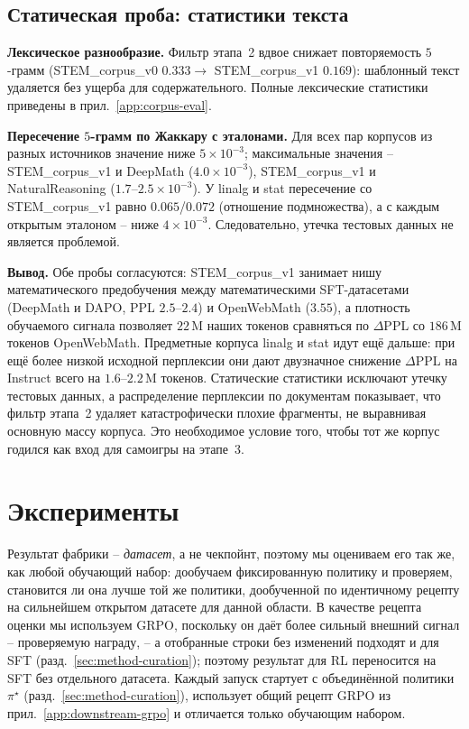 \documentclass{article}
\begin{document}
\subsection{Статическая проба: статистики текста}\label{sec:corpus-eval-static}

\textbf{Лексическое разнообразие.}
Фильтр этапа~2 вдвое снижает повторяемость $5$-грамм (STEM\_corpus\_v0 $0.333 \to$ STEM\_corpus\_v1 $0.169$): шаблонный текст удаляется без ущерба для содержательного. Полные лексические статистики приведены в прил.~\ref{app:corpus-eval}.

\textbf{Пересечение $5$-грамм по Жаккару с эталонами.}
Для всех пар корпусов из разных источников значение ниже $5\!\times\!10^{-3}$; максимальные значения -- STEM\_corpus\_v1 и DeepMath ($4.0\!\times\!10^{-3}$), STEM\_corpus\_v1 и NaturalReasoning ($1.7$--$2.5\!\times\!10^{-3}$). У linalg и stat пересечение со STEM\_corpus\_v1 равно $0.065$/$0.072$ (отношение подмножества), а с каждым открытым эталоном -- ниже $4\!\times\!10^{-3}$. Следовательно, утечка тестовых данных не является проблемой.

\textbf{Вывод.}
Обе пробы согласуются: STEM\_corpus\_v1 занимает нишу математического предобучения между математическими SFT-датасетами (DeepMath и DAPO, PPL $2.5$--$2.4$) и OpenWebMath ($3.55$), а плотность обучаемого сигнала позволяет $22$\,M наших токенов сравняться по $\Delta$PPL со $186$\,M токенов OpenWebMath. Предметные корпуса linalg и stat идут ещё дальше: при ещё более низкой исходной перплексии они дают двузначное снижение $\Delta$PPL на Instruct всего на $1.6$--$2.2$\,M токенов. Статические статистики исключают утечку тестовых данных, а распределение перплексии по документам показывает, что фильтр этапа~2 удаляет катастрофически плохие фрагменты, не выравнивая основную массу корпуса. Это необходимое условие того, чтобы тот же корпус годился как вход для самоигры на этапе~3.

\section{Эксперименты}\label{sec:exp}

Результат фабрики -- \emph{датасет}, а не чекпойнт, поэтому мы оцениваем его так же, как любой обучающий набор: дообучаем фиксированную политику и проверяем, становится ли она лучше той же политики, дообученной по идентичному рецепту на сильнейшем открытом датасете для данной области. В качестве рецепта оценки мы используем GRPO, поскольку он даёт более сильный внешний сигнал -- проверяемую награду, -- а отобранные строки без изменений подходят и для SFT (разд.~\ref{sec:method-curation}); поэтому результат для RL переносится на SFT без отдельного датасета. Каждый запуск стартует с объединённой политики $\pi^\star$ (разд.~\ref{sec:method-curation}), использует общий рецепт GRPO из прил.~\ref{app:downstream-grpo} и отличается только обучающим набором.
\end{document}
